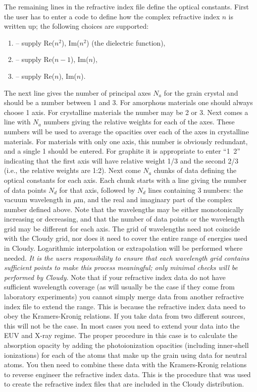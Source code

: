 The remaining lines in the refractive index file define the optical constants.
First the user has to enter a code to define how the complex refractive index
$n$ is written up; the following choices are supported:
\begin{enumerate}
\item
-- supply Re($n^2$), Im($n^2$) (the dielectric function),
\item
-- supply Re($n-1$), Im($n$),
\item
-- supply Re($n$), Im($n$).
\end{enumerate}
The next line gives the number of principal axes $N_a$ for the grain crystal
and should be a number between 1 and 3. For amorphous materials one should
always choose 1 axis. For crystalline materials the number may be 2 or 3. Next
comes a line with $N_a$ numbers giving the relative weights for each of the
axes. These numbers will be used to average the opacities over each of the
axes in crystalline materials. For materials with only one axis, this number
is obviously redundant, and a single 1 should be entered. For graphite it is
appropriate to enter ``1~2'' indicating that the first axis will have relative
weight 1/3 and the second 2/3 (i.e., the relative weights are 1:2). Next come
$N_a$ chunks of data defining the optical constants for each axis. Each chunk
starts with a line giving the number of data points $N_d$ for that axis,
followed by $N_d$ lines containing 3 numbers: the vacuum wavelength in $\mu$m, and
the real and imaginary part of the complex number defined above. Note that the
wavelengths may be either monotonically increasing or decreasing, and that the
number of data points or the wavelength grid may be different for each axis.
The grid of wavelengths need not coincide with the Cloudy grid, nor does it
need to cover the entire range of energies used in Cloudy. Logarithmic
interpolation or extrapolation will be performed where needed. {\em It is the
users responsibility to ensure that each wavelength grid contains sufficient
points to make this process meaningful; only minimal checks will be performed
by Cloudy.} Note that if your refractive index data do not have sufficient
wavelength coverage (as will usually be the case if they come from laboratory
experiments) you cannot simply merge data from another refractive index file
to extend the range. This is because the refractive index data need to obey
the Kramers-Kronig relations. If you take data from two different sources,
this will not be the case. In most cases you need to extend your data into the
EUV and X-ray regime. The proper procedure in this case is to calculate the
absorption opacity by adding the photoionization opacities (including
inner-shell ionizations) for each of the atoms that make up the grain using
data for neutral atoms. You then need to combine these data with the
Kramers-Kronig relations to reverse engineer the refractive index data. This
is the procedure that was used to create the refractive index files that are
included in the Cloudy distribution.

